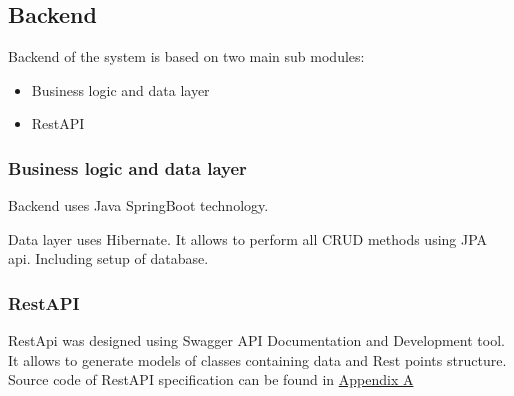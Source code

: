 \subsection{Backend}
Backend of the system is based on two main sub modules: 
\begin{itemize}
    \item Business logic and data layer
    \item RestAPI
\end{itemize}

\subsubsection{Business logic and data layer}
Backend uses Java SpringBoot technology.

Data layer uses Hibernate. It allows to perform all CRUD methods using JPA api. Including setup of database.

\subsubsection{RestAPI}
RestApi was designed using Swagger API Documentation and Development tool. It allows to generate models of classes containing data and Rest points structure. Source code of RestAPI specification can be found in \hyperref[sec:appendix_a]{Appendix A}
